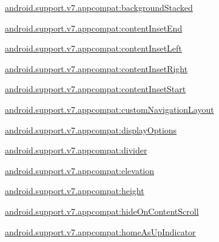 {\ttfamily \hyperlink{classandroid_1_1support_1_1v7_1_1appcompat_1_1R_1_1styleable_afc6f542df304273e42d5109d94293071}{android.\+support.\+v7.\+appcompat\+:background\+Stacked}}

{\ttfamily \hyperlink{classandroid_1_1support_1_1v7_1_1appcompat_1_1R_1_1styleable_a65308af43525946cf793f406019f7925}{android.\+support.\+v7.\+appcompat\+:content\+Inset\+End}}

{\ttfamily \hyperlink{classandroid_1_1support_1_1v7_1_1appcompat_1_1R_1_1styleable_ace29bce78f0578d736528d50188dee32}{android.\+support.\+v7.\+appcompat\+:content\+Inset\+Left}}

{\ttfamily \hyperlink{classandroid_1_1support_1_1v7_1_1appcompat_1_1R_1_1styleable_a03934a093a17b752258be0f5b6fef2f6}{android.\+support.\+v7.\+appcompat\+:content\+Inset\+Right}}

{\ttfamily \hyperlink{classandroid_1_1support_1_1v7_1_1appcompat_1_1R_1_1styleable_ac85953ed4627c156cb89dc481a4deaee}{android.\+support.\+v7.\+appcompat\+:content\+Inset\+Start}}

{\ttfamily \hyperlink{classandroid_1_1support_1_1v7_1_1appcompat_1_1R_1_1styleable_a33a27d2f5325f52eae7806c7b4498719}{android.\+support.\+v7.\+appcompat\+:custom\+Navigation\+Layout}}

{\ttfamily \hyperlink{classandroid_1_1support_1_1v7_1_1appcompat_1_1R_1_1styleable_acfe0523a711e29705cc7023bc685b2ed}{android.\+support.\+v7.\+appcompat\+:display\+Options}}

{\ttfamily \hyperlink{classandroid_1_1support_1_1v7_1_1appcompat_1_1R_1_1styleable_a56617522d251eb5d5d0331d27015fb73}{android.\+support.\+v7.\+appcompat\+:divider}}

{\ttfamily \hyperlink{classandroid_1_1support_1_1v7_1_1appcompat_1_1R_1_1styleable_ae579e5417de8c952045d216fc0ced26f}{android.\+support.\+v7.\+appcompat\+:elevation}}

{\ttfamily \hyperlink{classandroid_1_1support_1_1v7_1_1appcompat_1_1R_1_1styleable_ae5219a04a81a3e04ff4b973e9188ca3a}{android.\+support.\+v7.\+appcompat\+:height}}

{\ttfamily \hyperlink{classandroid_1_1support_1_1v7_1_1appcompat_1_1R_1_1styleable_ac03598addae3e6fc7d42a661b99b2572}{android.\+support.\+v7.\+appcompat\+:hide\+On\+Content\+Scroll}}

{\ttfamily \hyperlink{classandroid_1_1support_1_1v7_1_1appcompat_1_1R_1_1styleable_a12cecc9d3d4baf3fc85b7acce8e59955}{android.\+support.\+v7.\+appcompat\+:home\+As\+Up\+Indicator}}

